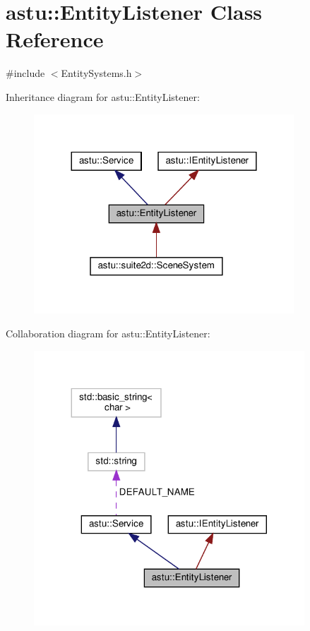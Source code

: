 \hypertarget{classastu_1_1EntityListener}{}\section{astu\+:\+:Entity\+Listener Class Reference}
\label{classastu_1_1EntityListener}


{\ttfamily \#include $<$Entity\+Systems.\+h$>$}



Inheritance diagram for astu\+:\+:Entity\+Listener\+:\nopagebreak
\begin{figure}[H]
\begin{center}
\leavevmode
\includegraphics[width=276pt]{classastu_1_1EntityListener__inherit__graph}
\end{center}
\end{figure}


Collaboration diagram for astu\+:\+:Entity\+Listener\+:\nopagebreak
\begin{figure}[H]
\begin{center}
\leavevmode
\includegraphics[width=287pt]{classastu_1_1EntityListener__coll__graph}
\end{center}
\end{figure}

